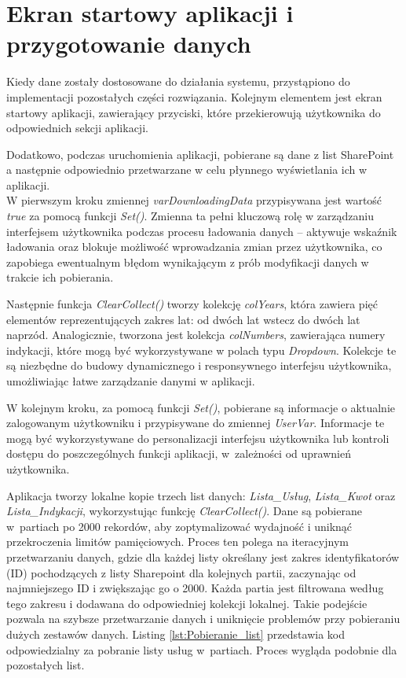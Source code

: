 \section{Ekran startowy aplikacji i przygotowanie danych}
\label{relacje-list}

Kiedy dane zostały dostosowane do działania systemu, przystąpiono do implementacji pozostałych części rozwiązania.
Kolejnym elementem jest ekran startowy aplikacji, zawierający przyciski, które przekierowują użytkownika do odpowiednich sekcji aplikacji.

Dodatkowo, podczas uruchomienia aplikacji, pobierane są dane z list SharePoint a następnie odpowiednio przetwarzane w celu płynnego wyświetlania ich w aplikacji. \\

W pierwszym kroku zmiennej \emph{varDownloadingData} przypisywana jest wartość \emph{true} za pomocą funkcji \emph{Set()}. Zmienna ta pełni kluczową rolę w zarządzaniu interfejsem użytkownika podczas procesu ładowania danych – aktywuje wskaźnik ładowania oraz blokuje możliwość wprowadzania zmian przez użytkownika, co zapobiega ewentualnym błędom wynikającym z prób modyfikacji danych w trakcie ich pobierania.

Następnie funkcja \emph{ClearCollect()} tworzy kolekcję \emph{colYears}, która zawiera pięć elementów reprezentujących zakres lat: od dwóch lat wstecz do dwóch lat naprzód. Analogicznie, tworzona jest kolekcja \emph{colNumbers}, zawierająca numery indykacji, które mogą być wykorzystywane w polach typu \emph{Dropdown}. Kolekcje te są niezbędne do budowy dynamicznego i responsywnego interfejsu użytkownika, umożliwiając łatwe zarządzanie danymi w aplikacji.

W kolejnym kroku, za pomocą funkcji \emph{Set()}, pobierane są informacje o aktualnie zalogowanym użytkowniku i przypisywane do zmiennej \emph{UserVar}. Informacje te mogą być wykorzystywane do personalizacji interfejsu użytkownika lub kontroli dostępu do poszczególnych funkcji aplikacji, w~zależności od uprawnień użytkownika.

Aplikacja tworzy lokalne kopie trzech list danych: \emph{Lista\_Usług}, \emph{Lista\_Kwot} oraz \emph{Lista\_Indykacji}, wykorzystując funkcję \emph{ClearCollect()}. Dane są pobierane w~partiach po 2000 rekordów, aby zoptymalizować wydajność i uniknąć przekroczenia limitów pamięciowych. Proces ten polega na iteracyjnym przetwarzaniu danych, gdzie dla każdej listy określany jest zakres identyfikatorów (ID) pochodzących z listy Sharepoint dla kolejnych partii, zaczynając od najmniejszego ID i zwiększając go o 2000. Każda partia jest filtrowana według tego zakresu i dodawana do odpowiedniej kolekcji lokalnej. Takie podejście pozwala na szybsze przetwarzanie danych i uniknięcie problemów przy pobieraniu dużych zestawów danych. Listing \ref{lst:Pobieranie_list} przedstawia kod odpowiedzialny za pobranie listy usług w~partiach. Proces wygląda podobnie dla pozostałych list.

